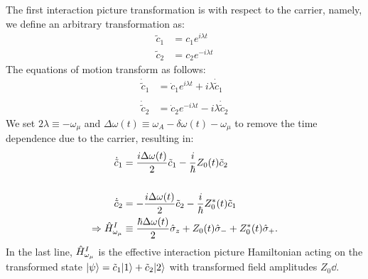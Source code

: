 The first interaction picture transformation is with respect to the carrier, namely, we define an arbitrary transformation as:
\begin{align}
\tilde{c}_1 &= c_1e^{i\lambda t} \\
\tilde{c}_2 &= c_2e^{-i\lambda t}
\end{align}
The equations of motion transform as follows:
\begin{align}
\dot{\tilde{c}}_1 & = \dot{c}_1 e^{i \lambda t} + i \lambda \dot{\tilde{c}}_1 \\
& \nonumber \\
\dot{\tilde{c}}_2 & = \dot{c}_2 e^{-i \lambda t} - i \lambda \dot{\tilde{c}}_2
\end{align}
We set $2\lambda \equiv -\omega_\mu$ and $\Delta \omega(t) \equiv \omega_A - \delta\omega(t) -\omega_\mu$ to remove the time dependence due to the carrier, resulting in:
\begin{align}
\dot{\tilde{c}}_1 & =  \frac{i\Delta \omega(t)}{2}\tilde{c}_1 - \frac{i}{\hbar}Z_0(t) \tilde{c}_2\\
& \nonumber \\
\dot{\tilde{c}}_2 & =  -\frac{i\Delta \omega(t) }{2}\tilde{c}_2- \frac{i}{\hbar}Z_0^*(t) \tilde{c}_1\\
 \Rightarrow \hat{H}_{\omega_\mu}^{I} &\equiv \frac{\hbar \Delta \omega(t)}{2}\hat{\sigma}_{z} + Z_0(t)\hat{\sigma}_{-} + Z_0^*(t)\hat{\sigma}_{+}.
\end{align}
In the last line, $\hat{H}_{\omega_\mu}^{I}$ is the effective interaction picture Hamiltonian acting on the transformed state $| \psi \rangle = \tilde{c}_1| 1 \rangle + \tilde{c}_2| 2 \rangle$ with transformed field amplitudes $Z_0\dd$.

